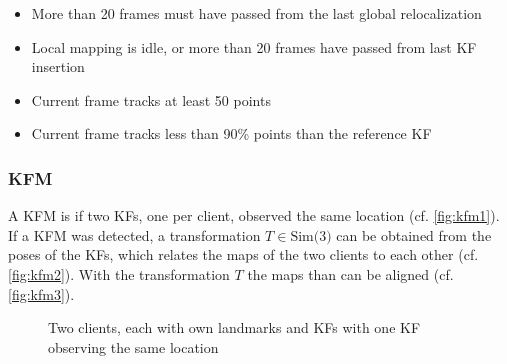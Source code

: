 \begin{itemize}
  \item More than 20 frames must have passed from the last global relocalization
  \item Local mapping is idle, or more than 20 frames have passed from last \ac{KF} insertion
  \item Current frame tracks at least 50 points
  \item Current frame tracks less than 90\% points than the reference \ac{KF}
\end{itemize}

\subsubsection{\acf{KFM}}
A \acf{KFM} is if two \acp{KF}, one per client, observed the same location (cf. \autoref{fig:kfm1}). If a \ac{KFM} was detected, a transformation $T \in \text{Sim(3)}$ can be obtained from the poses of the \acp{KF}, which relates the maps of the two clients to each other (cf. \autoref{fig:kfm2}). With the transformation $T$ the maps than can be aligned (cf. \autoref{fig:kfm3}).

\begin{figure}[H]
  \centering
  \caption{Two clients, each with own landmarks and \acp{KF} with one \ac{KF} observing the same location}
  \label{fig:kfm1}
\end{figure}

